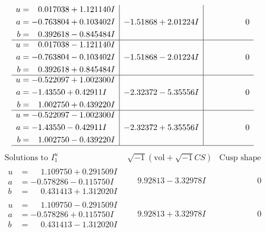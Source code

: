 \documentclass[1p]{elsarticle_modified}
\theoremstyle{definition}
\newcommand{\I}{\sqrt{-1}}
\begin{document}
$$\begin{array}{c|c|c}
\begin{aligned}
u &= \phantom{-}0.017038 + 1.121140 I \\
a &= -0.763804 + 0.103402 I \\
b &= \phantom{-}0.392618 - 0.845484 I\end{aligned}
 & -1.51868 + 2.01224 I & \phantom{-0.000000 } 0 \\ \hline\begin{aligned}
u &= \phantom{-}0.017038 - 1.121140 I \\
a &= -0.763804 - 0.103402 I \\
b &= \phantom{-}0.392618 + 0.845484 I\end{aligned}
 & -1.51868 - 2.01224 I & \phantom{-0.000000 } 0 \\ \hline\begin{aligned}
u &= -0.522097 + 1.002300 I \\
a &= -1.43550 + 0.42911 I \\
b &= \phantom{-}1.002750 + 0.439220 I\end{aligned}
 & -2.32372 - 5.35556 I & \phantom{-0.000000 } 0 \\ \hline\begin{aligned}
u &= -0.522097 - 1.002300 I \\
a &= -1.43550 - 0.42911 I \\
b &= \phantom{-}1.002750 - 0.439220 I\end{aligned}
 & -2.32372 + 5.35556 I & \phantom{-0.000000 } 0\\
 \hline 
 \end{array}$$\newpage$$\begin{array}{c|c|c}  
\text{Solutions to }I^u_{1}& \I (\text{vol} + \sqrt{-1}CS) & \text{Cusp shape}\\
 \hline 
\begin{aligned}
u &= \phantom{-}1.109750 + 0.291509 I \\
a &= -0.578286 - 0.115750 I \\
b &= \phantom{-}0.431413 + 1.312020 I\end{aligned}
 & \phantom{-}9.92813 - 3.32978 I & \phantom{-0.000000 } 0 \\ \hline\begin{aligned}
u &= \phantom{-}1.109750 - 0.291509 I \\
a &= -0.578286 + 0.115750 I \\
b &= \phantom{-}0.431413 - 1.312020 I\end{aligned}
 & \phantom{-}9.92813 + 3.32978 I & \phantom{-0.000000 } 0 \\ \hline\begin{aligned}

\end{aligned}
\end{array}$$
\end{document}
